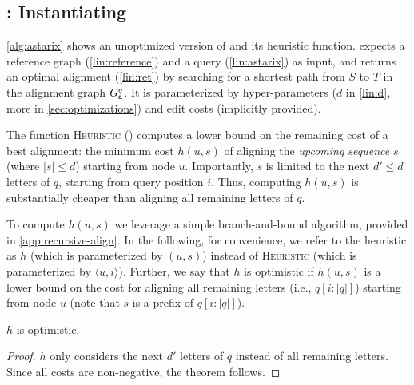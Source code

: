 



\subsection{\astarix: Instantiating \A} \label{subsec:astarix-heuristic}
\cref{alg:astarix} shows an unoptimized version of \astarix and its heuristic
function.
%
\astarix expects a reference graph (\cref{lin:reference}) and a query
(\cref{lin:astarix}) as input, and returns an optimal alignment (\cref{lin:ret})
by searching for a shortest path from $S$ to $T$ in the alignment graph $G_\texttt{a}^{q}$.
It is parameterized by hyper-parameters ($d$ in \cref{lin:d}, more in
\cref{sec:optimizations}) and edit costs (implicitly provided).

The function \textsc{Heuristic}
() computes a lower bound on
the remaining cost of a best alignment: the minimum cost $h(u,s)$ of aligning
the \emph{upcoming sequence} $s$ (where $\lvert s \rvert \leq d$) starting from
node $u$. Importantly, $s$ is limited to the next $d' \leq d$ letters of $q$,
starting from query position $i$. Thus, computing $h(u,s)$ is substantially
cheaper than aligning all remaining letters of $q$.

To compute $h(u,s)$ we leverage a simple branch-and-bound algorithm, provided in
\cref{app:recursive-align}. In the following, for convenience, we refer to the
heuristic as $h$ (which is parameterized by $(u,s)$) instead of
\textsc{Heuristic} (which is parameterized by $\langle u, i \rangle$). Further,
we say that $h$ is optimistic if $h(u,s)$ is a lower bound on the cost for
aligning all remaining letters (i.e., $q[i:|q|]$) starting from node $u$ (note
that $s$ is a prefix of $q[i:|q|]$).

\begin{samepage}
\begin{theorem} \label{thm:optimistic}
	$h$ is optimistic.
\end{theorem}
\begin{proof}
$h$ only considers the next $d'$ letters of $q$ instead of all
remaining letters. Since all costs are non-negative, the theorem follows.
\end{proof}
\end{samepage}

